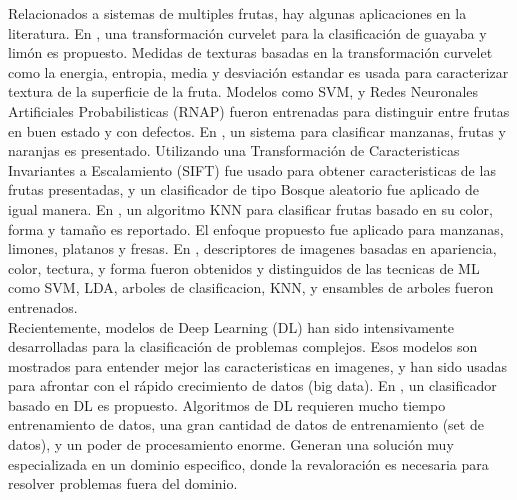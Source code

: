 \documentclass[twoside,spanish,ESP,MSc]{plantillaLabUPV}
\theoremstyle{definition}
\begin{document}
Relacionados a sistemas de multiples frutas, hay algunas aplicaciones en la literatura. En \cite{khoje}, una transformación curvelet para la clasificación de guayaba y limón es propuesto. Medidas de texturas basadas en la transformación curvelet como la energia, entropia, media y desviación estandar es usada para caracterizar textura de la superficie de la fruta. Modelos como SVM, y Redes Neuronales Artificiales  Probabilisticas (RNAP) fueron entrenadas para distinguir entre frutas en buen estado y con defectos. 
En \cite{7086191}, un sistema para clasificar manzanas, frutas y naranjas es presentado. Utilizando una Transformación de Caracteristicas Invariantes a Escalamiento (SIFT) fue usado para obtener caracteristicas de las frutas presentadas, y un clasificador de tipo Bosque aleatorio fue aplicado de igual manera. 
En \cite{5254804}, un algoritmo KNN para clasificar frutas basado en su color, forma y tamaño es reportado. El enfoque propuesto fue aplicado para manzanas, limones, platanos y fresas. En \cite{ROCHA201096}, descriptores de imagenes basadas en apariencia, color, tectura, y forma fueron obtenidos y distinguidos de las tecnicas de ML como SVM, LDA, arboles de clasificacion, KNN, y ensambles de arboles fueron entrenados.\\




Recientemente, modelos de Deep Learning (DL) han sido intensivamente desarrolladas para la clasificación de problemas complejos. Esos modelos son mostrados para entender mejor las caracteristicas en imagenes, y han sido usadas para afrontar con el rápido crecimiento de datos (big data). En \cite{8488544}, un clasificador basado en DL es propuesto. Algoritmos de DL requieren mucho tiempo entrenamiento de datos, una gran cantidad de datos de entrenamiento (set de datos), y un poder de procesamiento enorme. Generan una solución muy especializada en un dominio especifico, donde la revaloración es necesaria para resolver problemas fuera del dominio.\\


\end{document}
